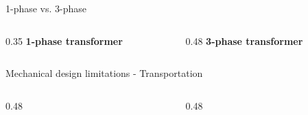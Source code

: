 \begin{frame}{1-phase vs. 3-phase}
  \begin{columns}[c,onlytextwidth]
    \begin{column}{0.35\textwidth}
      \centering
      \textbf{1-phase transformer}\\[0.4em]
    \end{column}
    \begin{column}{0.48\textwidth}
      \centering
      \textbf{3-phase transformer}\\[0.4em]
    \end{column}
  \end{columns}
\end{frame}

\begin{frame}{Mechanical design limitations - Transportation}
  \begin{columns}[c,onlytextwidth]
    \begin{column}{0.48\textwidth}
      \centering
    \end{column}
    \begin{column}{0.48\textwidth}
      \centering
    \end{column}
  \end{columns}
\end{frame}

